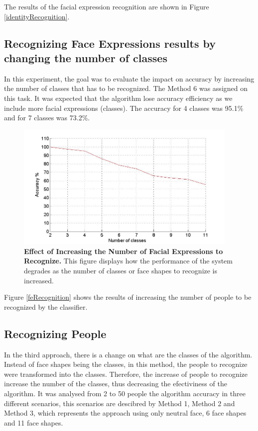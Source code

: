\documentclass[]{article}
\begin{document}
The results of the facial expression recognition are shown in Figure
\ref{identityRecognition}.
 
\subsection{Recognizing Face Expressions results by changing the number of
classes}

In this experiment, the goal was to evaluate the impact on accuracy by
increasing  the number of classes that has to be recognized. The Method 6 was
assigned on this task. It was expected that the algorithm lose accuracy
efficiency as we include more facial expressions (classes). The accuracy for 4
classes was 95.1\% and for 7 classes was 73.2\%.


\begin{figure}[ht]
\begin{center}
\vspace{-3mm}
\includegraphics[width=0.95\textwidth]{figures/50people_increasing_classes.jpg}
\end{center}
\caption{\textbf{Effect of Increasing the Number of Facial Expressions to Recognize.} This figure displays how the 
performance of the system degrades as the number of classes or face shapes to recognize is increased. }
\label{increasingNumberExpressions}
\end{figure}

Figure \ref{feRecognition} shows the results of increasing the number of people
to be recognized by the classifier.

\subsection{Recognizing People}

In the third approach, there is a change on what are the classes of the
algorithm. Instead of face shapes being the classes, in this method, the people
to recognize were transformed into the classes. Therefore, the increase of
people to recognize increase the number of the classes, thus decreasing the
efectiviness of the algorithm. It was analysed from 2 to 50 people the algorithm
accuracy in three different scenarios, this scenarios are descibred by Method 1,
Method 2 and Method 3, which represents the approach using only neutral face, 6
face shapes and 11 face shapes.
\end{document}
